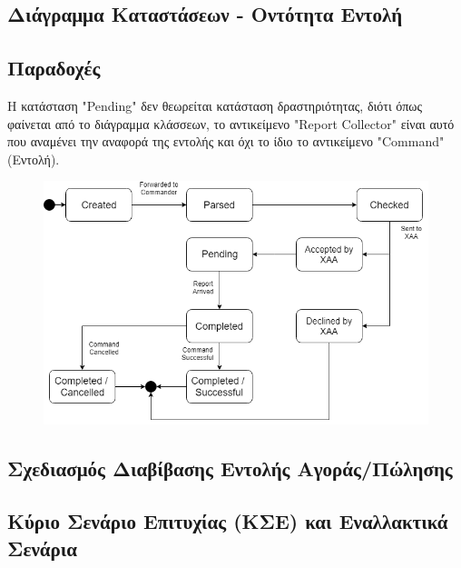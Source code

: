 \documentclass{article}
\begin{document}
\newpage
\subsection{Διάγραμμα Καταστάσεων - Οντότητα Εντολή}
\subsection*{Παραδοχές}
Η κατάσταση "Pending" δεν θεωρείται κατάσταση δραστηριότητας, διότι όπως φαίνεται από το διάγραμμα κλάσσεων, το αντικείμενο
"Report Collector" είναι αυτό που αναμένει την αναφορά της εντολής και όχι το ίδιο το αντικείμενο "Command" (Εντολή).

\begin{figure}[!h]
	\includegraphics[width=\linewidth]{../UML/state_diagram.png}
\end{figure}

\subsection*{Σχεδιασμός Διαβίβασης Εντολής Αγοράς/Πώλησης}

\subsection{Κύριο Σενάριο Επιτυχίας (ΚΣΕ) και Εναλλακτικά Σενάρια}
\end{document}
